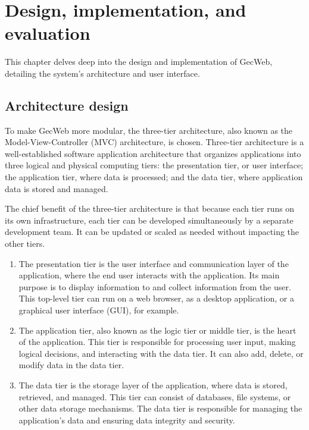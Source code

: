 \chapter{Design, implementation, and evaluation}
\label{chapter:design}

This chapter delves deep into the design and implementation of GecWeb, detailing the system's architecture and user interface.

\section{Architecture design}

To make GecWeb more modular, the three-tier architecture, also known as the Model-View-Controller (MVC) architecture, is chosen.
Three-tier architecture is a well-established software application architecture that organizes applications into three logical and physical computing tiers: the presentation tier, or user interface; the application tier, where data is processed; and the data tier, where application data is stored and managed.

The chief benefit of the three-tier architecture is that because each tier runs on its own infrastructure, each tier can be developed simultaneously by a separate development team.
It can be updated or scaled as needed without impacting the other tiers.

\begin{enumerate}
  \item The presentation tier is the user interface and communication layer of the application, where the end user interacts with the application.
        Its main purpose is to display information to and collect information from the user.
        This top-level tier can run on a web browser, as a desktop application, or a graphical user interface (GUI), for example.

  \item The application tier, also known as the logic tier or middle tier, is the heart of the application.
        This tier is responsible for processing user input, making logical decisions, and interacting with the data tier.
        It can also add, delete, or modify data in the data tier.

  \item The data tier is the storage layer of the application, where data is stored, retrieved, and managed.
        This tier can consist of databases, file systems, or other data storage mechanisms.
        The data tier is responsible for managing the application's data and ensuring data integrity and security.
\end{enumerate}

